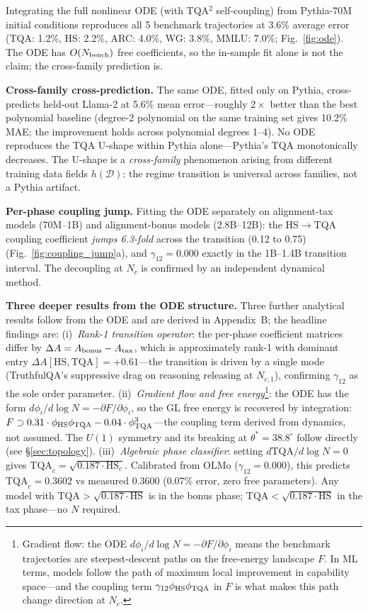 \documentclass[11pt]{article}
\begin{document}
Integrating the full nonlinear ODE (with TQA$^2$ self-coupling) from Pythia-70M initial conditions
reproduces all 5 benchmark trajectories at 3.6\% average error
(TQA: 1.2\%, HS: 2.2\%, ARC: 4.0\%, WG: 3.8\%, MMLU: 7.0\%; Fig.~\ref{fig:ode}).
The ODE has $O(N_{\rm bench})$ free coefficients, so the in-sample fit alone is not the claim; the cross-family prediction is.

\textbf{Cross-family cross-prediction.}
The same ODE, fitted only on Pythia, cross-predicts held-out Llama-2 at 5.6\% mean error---roughly $2\times$ better than the best polynomial baseline (degree-2 polynomial on the same training set gives 10.2\% MAE; the improvement holds across polynomial degrees 1--4).
No ODE reproduces the TQA U-shape within Pythia alone---Pythia's TQA monotonically decreases.
The U-shape is a \emph{cross-family} phenomenon arising from different training data fields $h(\mathcal{D})$:
the regime transition is universal across families, not a Pythia artifact.

\textbf{Per-phase coupling jump.}
Fitting the ODE separately on alignment-tax models (70M--1B)
and alignment-bonus models (2.8B--12B): the HS$\to$TQA coupling coefficient
\emph{jumps 6.3-fold} across the transition (0.12 to 0.75) (Fig.~\ref{fig:coupling_jump}a),
and $\gamma_{12} = 0.000$ exactly in the 1B--1.4B transition interval.
The decoupling at $N_c$ is confirmed by an independent dynamical method.

\textbf{Three deeper results from the ODE structure.}
Three further analytical results follow from the ODE and are derived in Appendix~B; the headline findings are:
(i)~\emph{Rank-1 transition operator}: the per-phase coefficient matrices differ by $\Delta A = A_{\rm bonus} - A_{\rm tax}$, which is approximately rank-1 with dominant entry $\Delta A[\mathrm{HS},\mathrm{TQA}] = +0.61$---the transition is driven by a single mode (TruthfulQA's suppressive drag on reasoning releasing at $N_{c,1}$), confirming $\gamma_{12}$ as the sole order parameter.
(ii)~\emph{Gradient flow and free energy}\footnote{Gradient flow: the ODE $d\phi_i/d\log N = -\partial F/\partial\phi_i$ means the benchmark trajectories are steepest-descent paths on the free-energy landscape $F$. In ML terms, models follow the path of maximum local improvement in capability space---and the coupling term $\gamma_{12}\phi_{\rm HS}\phi_{\rm TQA}$ in $F$ is what makes this path change direction at $N_c$.}: the ODE has the form $d\phi_i/d\log N = -\partial F/\partial\phi_i$, so the GL free energy is recovered by integration: $F \supset 0.31\cdot\phi_{\rm HS}\phi_{\rm TQA} - 0.04\cdot\phi_{\rm TQA}^3$---the coupling term derived from dynamics, not assumed.
The $U(1)$ symmetry and its breaking at $\theta^*=38.8^\circ$ follow directly (see \S\ref{sec:topology}).
(iii)~\emph{Algebraic phase classifier}: setting $d\mathrm{TQA}/d\log N = 0$ gives $\mathrm{TQA}_c = \sqrt{0.187\cdot\mathrm{HS}_c}$.
Calibrated from OLMo ($\gamma_{12}=0.000$), this predicts $\mathrm{TQA}_c = 0.3602$ vs measured $0.3600$ (0.07\% error, zero free parameters).
Any model with $\mathrm{TQA} > \sqrt{0.187\cdot\mathrm{HS}}$ is in the bonus phase; $\mathrm{TQA} < \sqrt{0.187\cdot\mathrm{HS}}$ in the tax phase---no $N$ required.
\end{document}
